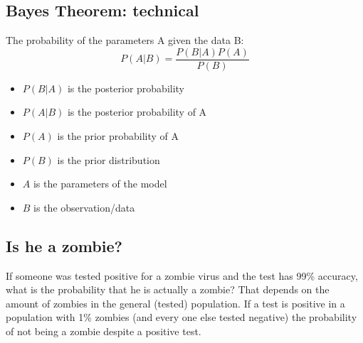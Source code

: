 \documentclass{article}
\begin{document}
\subsection{Bayes Theorem: technical}
The probability of the parameters A given the data B: $$P(A|B) = \frac{P(B|A) P(A)}{P(B)}$$ 

\begin{itemize}
    \item $P(B|A)$ is the posterior probability
    \item $P(A|B)$ is the posterior probability of A
    \item $P(A)$ is the prior probability of A
    \item $P(B)$ is the prior distribution
    \item $A$ is the parameters of the model
    \item $B$ is the observation/data
\end{itemize}

\subsection{Is he a zombie?}
If someone was tested positive for a zombie virus and the test has 99\% accuracy, what is the probability that he is actually a zombie? That depends on the amount of zombies in the general (tested) population. If a test is positive in a population with 1\% zombies (and every one else tested negative) the probability of not being a zombie despite a positive test.
\end{document}
